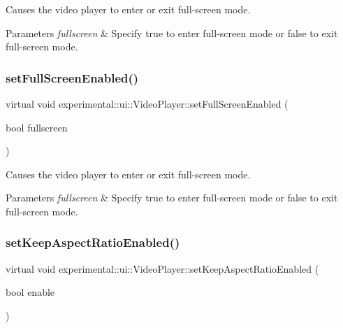 Causes the video player to enter or exit full-\/screen mode.


\begin{DoxyParams}{Parameters}
{\em fullscreen} & Specify true to enter full-\/screen mode or false to exit full-\/screen mode. \\
\hline
\end{DoxyParams}
\mbox{\label{classexperimental_1_1ui_1_1VideoPlayer_ab22336427d46be866e023e5b57f5fe68}} 
\subsubsection{\texorpdfstring{set\+Full\+Screen\+Enabled()}{setFullScreenEnabled()}\hspace{0.1cm}{\footnotesize\ttfamily [2/2]}}
{\footnotesize\ttfamily virtual void experimental\+::ui\+::\+Video\+Player\+::set\+Full\+Screen\+Enabled (\begin{DoxyParamCaption}\item[{bool}]{fullscreen }\end{DoxyParamCaption})\hspace{0.3cm}{\ttfamily [virtual]}}

Causes the video player to enter or exit full-\/screen mode.


\begin{DoxyParams}{Parameters}
{\em fullscreen} & Specify true to enter full-\/screen mode or false to exit full-\/screen mode. \\
\hline
\end{DoxyParams}
\mbox{\label{classexperimental_1_1ui_1_1VideoPlayer_a97787adc7535bbdbb74970784015ce01}} 
\subsubsection{\texorpdfstring{set\+Keep\+Aspect\+Ratio\+Enabled()}{setKeepAspectRatioEnabled()}\hspace{0.1cm}{\footnotesize\ttfamily [1/2]}}
{\footnotesize\ttfamily virtual void experimental\+::ui\+::\+Video\+Player\+::set\+Keep\+Aspect\+Ratio\+Enabled (\begin{DoxyParamCaption}\item[{bool}]{enable }\end{DoxyParamCaption})\hspace{0.3cm}{\ttfamily [virtual]}}

